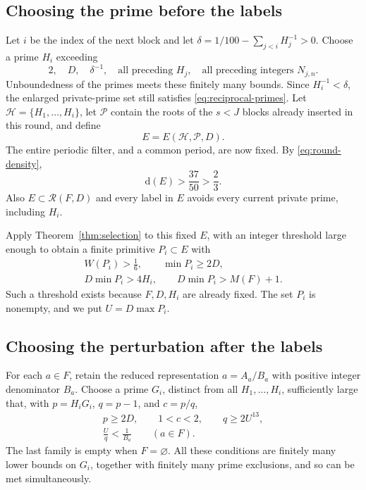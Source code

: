 \documentclass[11pt,reqno]{amsart}
\theoremstyle{definition}
\theoremstyle{remark}
\numberwithin{equation}{section}
\newcommand{\dens}{\mathrm d}
\newcommand{\cR}{\mathcal R}
\begin{document}
\subsection{Choosing the prime before the labels}
Let $i$ be the index of the next block and let
$\delta=1/100-\sum_{j<i}H_j^{-1}>0$. Choose a prime $H_i$ exceeding
\begin{equation}\label{eq:H-choice}
 2,\quad D,\quad \delta^{-1},\quad
 \text{all preceding }H_j,\quad
 \text{all preceding integers }N_{j,n}.
\end{equation}
Unboundedness of the primes meets these finitely many bounds.
Since $H_i^{-1}<\delta$, the enlarged private-prime set still satisfies
\eqref{eq:reciprocal-primes}. Let $\mathcal H=\{H_1,\ldots,H_i\}$,
let $\mathcal P$ contain the roots of the $s<J$ blocks already inserted
in this round, and define
\begin{equation}\label{eq:E-choice}
 E=E(\mathcal H,\mathcal P,D).
\end{equation}
The entire periodic filter, and a common period, are now fixed. By
\eqref{eq:round-density},
\begin{equation}\label{eq:E-density}
 \dens(E)>\frac{37}{50}>\frac23.
\end{equation}
Also $E\subset\cR(F,D)$ and every label in $E$ avoids every current
private prime, including $H_i$.

Apply Theorem~\ref{thm:selection} to this fixed $E$, with an integer
threshold large enough to obtain a finite primitive $P_i\subset E$ with
\begin{equation}\label{eq:P-choice}
 \begin{gathered}
 W(P_i)>\frac16,\qquad
 \min P_i\geq2D,\\
 D\min P_i>4H_i,\qquad
 D\min P_i>M(F)+1.
 \end{gathered}
\end{equation}
Such a threshold exists because $F,D,H_i$ are already fixed. The set
$P_i$ is nonempty, and we put $U=D\max P_i$.

\subsection{Choosing the perturbation after the labels}
For each $a\in F$, retain the reduced representation $a=A_a/B_a$ with positive
integer denominator $B_a$. Choose a prime $G_i$, distinct from all
$H_1,\ldots,H_i$, sufficiently large that, with
$p=H_iG_i$, $q=p-1$, and $c=p/q$,
\begin{equation}\label{eq:G-choice}
 \begin{gathered}
 p\geq2D,\qquad 1<c<2,\qquad q\geq2U^{13},\\
 \frac Uq<\frac1{B_a}\qquad(a\in F).
 \end{gathered}
\end{equation}
The last family is empty when $F=\varnothing$. All these conditions are
finitely many lower bounds on $G_i$, together with finitely many prime
exclusions, and so can be met simultaneously.
\end{document}

